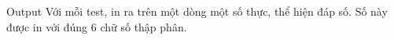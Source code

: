 Output
Với mỗi test, in ra trên một dòng một số thực, thể hiện đáp số. Số này được in với đúng 6 chữ số thập phân.